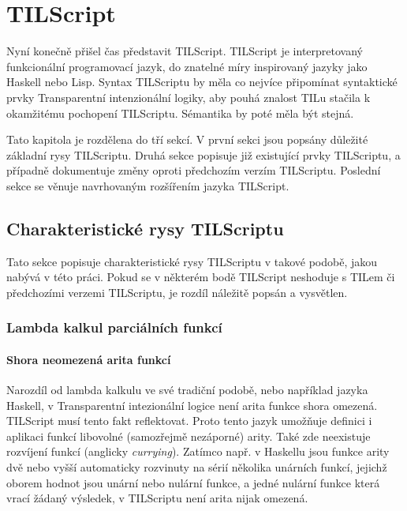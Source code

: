 \chapter{TILScript}

Nyní konečně přišel čas představit TILScript. TILScript je interpretovaný funkcionální programovací
jazyk, do znatelné míry inspirovaný jazyky jako Haskell nebo Lisp. Syntax TILScriptu by měla co
nejvíce připomínat syntaktické prvky Transparentní intenzionální logiky, aby pouhá znalost TILu
stačila k okamžitému pochopení TILScriptu. Sémantika by poté měla být stejná.

Tato kapitola je rozdělena do tří sekcí. V první sekci jsou popsány důležité základní rysy
TILScriptu. Druhá sekce popisuje již existující prvky TILScriptu, a případně dokumentuje změny
oproti předchozím verzím TILScriptu. Poslední sekce se věnuje navrhovaným rozšířením jazyka
TILScript.

\section{Charakteristické rysy TILScriptu}

Tato sekce popisuje charakteristické rysy TILScriptu v takové podobě, jakou nabývá v této práci.
Pokud se v některém bodě TILScript neshoduje s TILem či předchozími verzemi TILScriptu, je rozdíl
náležitě popsán a vysvětlen.

\subsection{Lambda kalkul parciálních funkcí}

\subsubsection{Shora neomezená arita funkcí}


Narozdíl od lambda kalkulu ve své tradiční podobě, nebo například jazyka Haskell, v Transparentní
intezionální logice není arita funkce shora omezená. TILScript musí tento fakt reflektovat. Proto
tento jazyk umožňuje definici i aplikaci funkcí libovolné (samozřejmě nezáporné) arity. Také zde
neexistuje rozvíjení funkcí (anglicky \textit{currying}). Zatímco např. v Haskellu jsou funkce
arity dvě nebo vyšší automaticky rozvinuty na sérií několika unárních funkcí, jejichž oborem hodnot
jsou unární nebo nulární funkce, a jedné nulární funkce která vrací žádaný výsledek, v TILScriptu
není arita nijak omezená.

